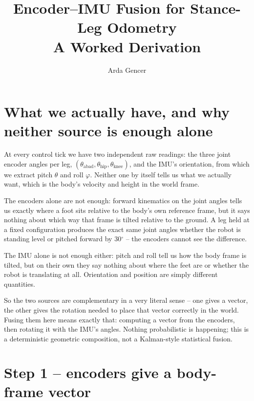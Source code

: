 \documentclass[11pt]{article}
\title{Encoder--IMU Fusion for Stance-Leg Odometry\\[2pt]\large A Worked Derivation}
\author{Arda Gencer}
\date{}
\begin{document}
\maketitle

\section{What we actually have, and why neither source is enough alone}

At every control tick we have two independent raw readings: the three joint
encoder angles per leg, $(\theta_{\text{abad}}, \theta_{\text{hip}}, \theta_{\text{knee}})$,
and the IMU's orientation, from which we extract pitch $\theta$ and roll
$\varphi$. Neither one by itself tells us what we actually want, which is the
body's velocity and height in the world frame.

The encoders alone are not enough: forward kinematics on the joint angles
tells us exactly where a foot sits relative to the body's own reference
frame, but it says nothing about which way that frame is tilted relative to
the ground. A leg held at a fixed configuration produces the exact same
joint angles whether the robot is standing level or pitched forward by
30$^\circ$ -- the encoders cannot see the difference.

The IMU alone is not enough either: pitch and roll tell us how the body
frame is tilted, but on their own they say nothing about where the feet
are or whether the robot is translating at all. Orientation and position
are simply different quantities.

So the two sources are complementary in a very literal sense -- one gives a
vector, the other gives the rotation needed to place that vector correctly
in the world. Fusing them here means exactly that: computing a vector from
the encoders, then rotating it with the IMU's angles. Nothing probabilistic
is happening; this is a deterministic geometric composition, not a
Kalman-style statistical fusion.

\section{Step 1 -- encoders give a body-frame vector}
\end{document}
